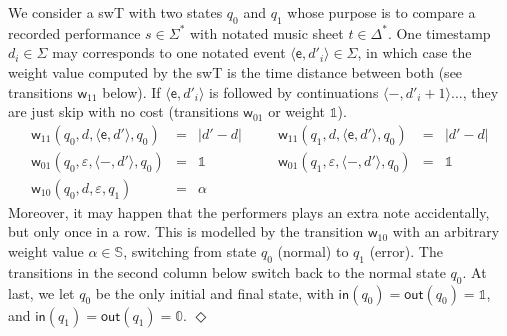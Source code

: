 \documentclass[runningheads]{llncs}
\def\endex{\hspace*{\fill} $\Diamond$\smallskip }
{\theorembodyfont{\rmfamily} \theoremstyle{break} \newtheorem{algo}{Algorithm}}
\def\<#1>{\langle #1 \rangle}
\newcommand{\Semiring}{\mathbb{S}}
\newcommand{\zero}{\mathbb{0}}
\newcommand{\one}{\mathbb{1}}
\def\SWT{\textsf{swT}\xspace}
\def\wei{\mathsf{w}}
\def\init{\mathsf{in}}
\def\final{\mathsf{out}}
\begin{document}
\begin{example}
We consider a \SWT with two states $q_0$ and $q_1$ whose purpose 
is to compare a recorded performance $s \in \Sigma^*$
with notated music sheet $t \in \Delta^*$.
One timestamp $d_i \in \Sigma$ may corresponds 
to one notated event $\<\mathsf{e}, d'_i> \in \Sigma$, in which case 
the weight value computed by the \SWT is the time distance between both
(see transitions $\wei_{11}$ below).
%
If $\<\mathsf{e}, d'_i>$ is followed by continuations 
$\<\mathsf{-}, d'_{i+1}>$..., they are just skip with no cost (transitions $\wei_{01}$ or weight $\one$).
\[
\begin{array}{rclcrcl}
\wei_{11}(q_0, d, \< \mathsf{e}, d'>, q_0) & = & |d' - d| & \quad &
\wei_{11}(q_1, d, \< \mathsf{e}, d'>, q_0) & = & |d' - d|\\
\wei_{01}(q_0, \varepsilon, \< \mathsf{-}, d'>, q_0) & = & \one & &
\wei_{01}(q_1, \varepsilon, \< \mathsf{-}, d'>, q_0) & = & \one\\
\wei_{10}(q_0, d, \varepsilon, q_1) & = & \alpha & & %
\end{array}
\]
%
Moreover, it may happen that the performers plays an extra note accidentally, but only once in a row. 
This is modelled by the transition $\wei_{10}$ with an arbitrary weight value $\alpha \in \Semiring$, 
switching from state $q_0$ (normal) to $q_1$ (error).
The transitions in the second column below switch back to the normal state $q_0$.
At last, we let $q_0$ be the only initial and final state, with
$\init(q_0) = \final(q_0) = \one$, and 
$\init(q_1) = \final(q_1) = \zero$. 
\endex
\end{example}
\end{document}
